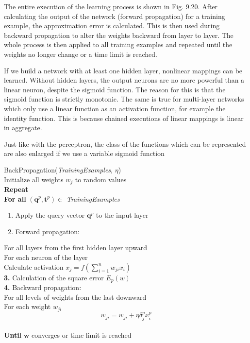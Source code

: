 \documentclass[10pt]{book}
\begin{document}
The entire execution of the learning process is shown in Fig. 9.20. After calculating the output of the network (forward propagation) for a training example, the approximation error is calculated. This is then used during backward propagation to alter the weights backward from layer to layer. The whole process is then applied to all training examples and repeated until the weights no longer change or a time limit is reached.

If we build a network with at least one hidden layer, nonlinear mappings can be learned. Without hidden layers, the output neurons are no more powerful than a linear neuron, despite the sigmoid function. The reason for this is that the sigmoid function is strictly monotonic. The same is true for multi-layer networks which only use a linear function as an activation function, for example the identity function. This is because chained executions of linear mappings is linear in aggregate.

Just like with the perceptron, the class of the functions which can be represented are also enlarged if we use a variable sigmoid function

BackPropagation(\textit{TrainingExamples}, $\eta$)\\
Initialize all weights $w_{j}$ to random values\\
\textbf{Repeat}\\
\textbf{For all} $\left(\boldsymbol{q}^{p}, \boldsymbol{t}^{p}\right) \in$ \textit{TrainingExamples}\\[0.5ex]
\begin{enumerate}
  \item[\textbf{1.}] Apply the query vector $\boldsymbol{q}^{p}$ to the input layer
  \item[\textbf{2.}] Forward propagation:
\end{enumerate}
For all layers from the first hidden layer upward\\
For each neuron of the layer\\
Calculate activation $x_{j}=f\left(\sum_{i=1}^{n} w_{j i} x_{i}\right)$\\[0.5ex]
\textbf{3.} Calculation of the square error $E_{p}(w)$\\[0.5ex]
\textbf{4.} Backward propagation:\\
For all levels of weights from the last downward\\
For each weight $w_{j i}$\\
\[
w_{j i}=w_{j i}+\eta \delta_{j}^{p} x_{i}^{p}
\]\\
\textbf{Until} $\boldsymbol{w}$ converges or time limit is reached
\end{document}
